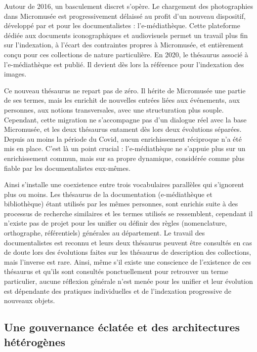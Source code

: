Autour de 2016, un basculement discret s’opère. Le chargement des photographies dans Micromusée est progressivement délaissé au profit d’un nouveau dispositif, développé par et pour les documentalistes : l’e-médiathèque. Cette plateforme dédiée aux documents iconographiques et audiovisuels permet un travail plus fin sur l’indexation, à l’écart des contraintes propres à Micromusée, et entièrement conçu pour ces collections de nature particulière. En 2020, le thésaurus associé à l’e-médiathèque est publié. Il devient dès lors la référence pour l’indexation des images.

Ce nouveau thésaurus ne repart pas de zéro. Il hérite de Micromusée une partie de ses termes, mais les enrichit de nouvelles entrées liées aux événements, aux personnes, aux notions transversales, avec une structuration plus souple. Cependant, cette migration ne s’accompagne pas d’un dialogue réel avec la base Micromusée, et les deux thésaurus entament dès lors deux évolutions séparées. Depuis au moins la période du Covid, aucun enrichissement réciproque n’a été mis en place. C’est là un point crucial : l’e-médiathèque ne s’appuie plus sur un enrichissement commun, mais sur sa propre dynamique, considérée comme plus fiable par les documentalistes eux-mêmes.

Ainsi s'installe une coexistence entre trois vocabulaires parallèles qui s'ignorent plus ou moins. Les thésaurus de la documentation (e-médiathèque et bibliothèque) étant utilisés par les mêmes personnes, sont enrichis suite à des processus de recherche similaires et les termes utilisés se ressemblent, cependant il n'existe pas de projet pour les unifier ou définir des règles (nomenclature, orthographe, référentiels) générales au département. Le travail des documentalistes est reconnu et leurs deux thésaurus peuvent être consultés en cas de doute lors des évolutions faites sur les thésaurus de description des collections, mais l'inverse est rare. Ainsi, même s'il existe une conscience de l'existence de ces thésaurus et qu'ils sont consultés ponctuellement pour retrouver un terme particulier, aucune réflexion générale n'est menée pour les unifier et leur évolution est dépendante des pratiques individuelles et de l'indexation progressive de nouveaux objets.

\subsection{Une gouvernance éclatée et des architectures hétérogènes}

